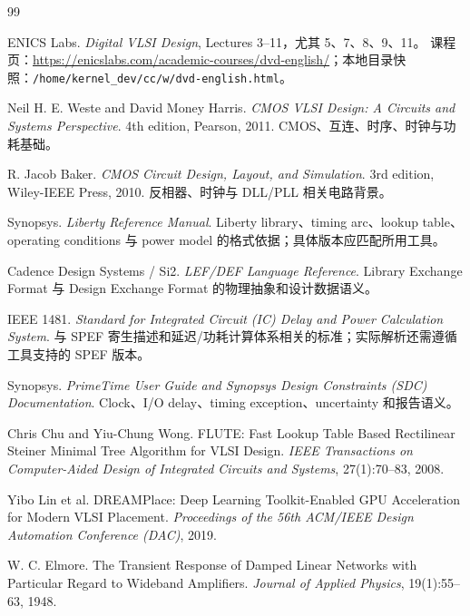 \documentclass[UTF8,a4paper,11pt,fontset=fandol]{ctexart}
\numberwithin{equation}{section}
\newcommand{\code}[1]{\nolinkurl{#1}}
\begin{document}
\begin{thebibliography}{99}

ENICS Labs.
\newblock \emph{Digital VLSI Design}, Lectures 3--11，尤其 5、7、8、9、11。
\newblock 课程页：\url{https://enicslabs.com/academic-courses/dvd-english/}；本地目录快照：\code{/home/kernel_dev/cc/w/dvd-english.html}。

Neil H. E. Weste and David Money Harris.
\newblock \emph{CMOS VLSI Design: A Circuits and Systems Perspective}.
\newblock 4th edition, Pearson, 2011. CMOS、互连、时序、时钟与功耗基础。

R. Jacob Baker.
\newblock \emph{CMOS Circuit Design, Layout, and Simulation}.
\newblock 3rd edition, Wiley-IEEE Press, 2010. 反相器、时钟与 DLL/PLL 相关电路背景。

Synopsys.
\newblock \emph{Liberty Reference Manual}.
\newblock Liberty library、timing arc、lookup table、operating conditions 与 power model 的格式依据；具体版本应匹配所用工具。

Cadence Design Systems / Si2.
\newblock \emph{LEF/DEF Language Reference}.
\newblock Library Exchange Format 与 Design Exchange Format 的物理抽象和设计数据语义。

IEEE 1481.
\newblock \emph{Standard for Integrated Circuit (IC) Delay and Power Calculation System}.
\newblock 与 SPEF 寄生描述和延迟/功耗计算体系相关的标准；实际解析还需遵循工具支持的 SPEF 版本。

Synopsys.
\newblock \emph{PrimeTime User Guide and Synopsys Design Constraints (SDC) Documentation}.
\newblock Clock、I/O delay、timing exception、uncertainty 和报告语义。

Chris Chu and Yiu-Chung Wong.
\newblock FLUTE: Fast Lookup Table Based Rectilinear Steiner Minimal Tree Algorithm for VLSI Design.
\newblock \emph{IEEE Transactions on Computer-Aided Design of Integrated Circuits and Systems}, 27(1):70--83, 2008.

Yibo Lin et al.
\newblock DREAMPlace: Deep Learning Toolkit-Enabled GPU Acceleration for Modern VLSI Placement.
\newblock \emph{Proceedings of the 56th ACM/IEEE Design Automation Conference (DAC)}, 2019.

W. C. Elmore.
\newblock The Transient Response of Damped Linear Networks with Particular Regard to Wideband Amplifiers.
\newblock \emph{Journal of Applied Physics}, 19(1):55--63, 1948.


\end{thebibliography}
\end{document}
